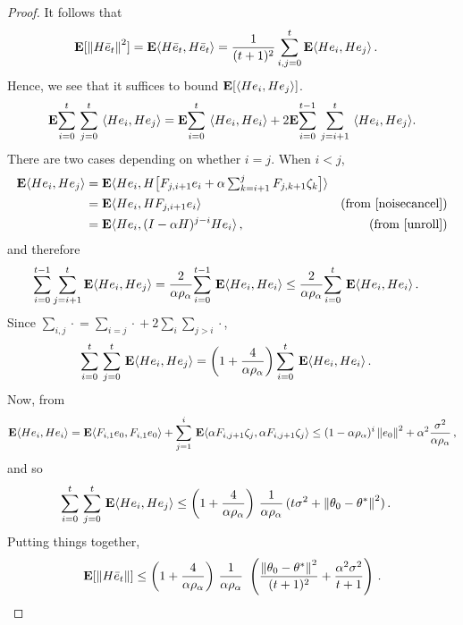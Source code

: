 \begin{proof}
It follows that 
\begin{align*}
\E[\norm{H\eb_t}^2]&=\E\ip{H\eb_t,H\eb_t}
 =\frac{1}{(t+1)^2} \sum_{i,j=0}^t \E\ip{H e_i,He_j}\,.
\end{align*}
Hence, we see that it suffices to bound $\EE{\ip{H e_i, H e_j }}$.
\begin{align*}
\E\ous{\sum}{i=0}{t}\ous{\sum}{j=0}{t}\ip{He_i,He_j}=\E\ous{\sum}{i=0}{t}\ip{He_i,He_i}+ 2\E\ous{\sum}{i=0}{t-1}\ous{\sum}{j=i+1}{t}\ip{He_i,He_j}.
\end{align*}
\fi
There are two cases depending on whether $i=j$. When $i< j$,
\begin{align*}
\E\ip{He_i,He_j}
&=\E \ip{He_i,H\big[F_{j,i+1} e_i+\alpha\textstyle\sum_{k=i+1}^j F_{j,k+1}\zeta_{k}\big]}\\
&=\E\ip{He_i,H F_{j,i+1} e_i} & \text{(from \Cref{noisecancel})}\\
&=\E\ip{He_i,(I-\alpha H)^{j-i}H e_i}\,, &\text{(from \Cref{unroll})}
\end{align*}
and therefore
\begin{align*}
\label{inter}
\sum_{i=0}^{t-1}\sum_{j=i+1}^t \E\ip{ He_i,H e_j}
&=\frac2{\alpha\rho_{\alpha}} \ous{\sum}{i=0}{t-1}\E\ip{He_i,H e_i}
\leq \frac2{\alpha\rho_{\alpha}}\ous{\sum}{i=0}{t}\E\ip{He_i,H e_i}\,.
\end{align*}
Since $\sum_{i,j}\cdot{} = \sum_{i=j}\cdot{} + 2 \sum_i \sum_{j>i} \cdot{}$,
\begin{align*}
\ous{\sum}{i=0}{t}\ous{\sum}{j=0}{t} \E\ip{He_i,He_j}&= \left(1+\frac4{\alpha\rho_{\alpha}}\right)\ous{\sum}{i=0}{t}\E\ip{He_i,He_i}\,.
\end{align*}
Now, from 
\begin{align*}
\E\ip{He_i,He_i}=\E\ip{F_{i,1}e_0,F_{i,1}e_0}+\ous{\sum}{j=1}{i}\E\ip{\alpha F_{i,j+1}\zeta_j,\alpha F_{i,j+1}\zeta_j}
\leq (1-\alpha\rho_{\alpha})^i\norm{e_0}^2+ \alpha^2\frac{\sigma^2}{\alpha \rho_\alpha}\,,
\end{align*}
and so
\begin{align*}
\ous{\sum}{i=0}{t}\ous{\sum}{j=0}{t} \E\ip{He_i,He_j}
&\leq \left(1+\frac4{\alpha\rho_{\alpha}}\right)\, \frac1{\alpha\rho_{\alpha}}\, (t\sigma^2+\norm{\theta_0-\ts}^2)\,.
\end{align*}
Putting things together,
\begin{align}
\E[\norm{H\eb_t}]
\leq \left(1+\frac4{\alpha\rho_{\alpha}}\right)\, \frac1{\alpha\rho_{\alpha}}\, \,
		\left(\frac{\norm{\theta_0-\ts}^2}{(t+1)^2}+ \frac{\alpha^2\sigma^2}{t+1} \right)\,.
\end{align}
\end{proof}

